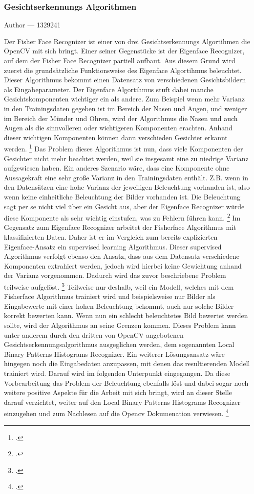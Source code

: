 \documentclass[12pt, a4paper]{report}
\makeatletter
\newcommand{\sectionauthor}[1]{%
  {\parindent0pt\vspace*{-5pt}%
  \large{Author --- }
  \linespread{1.1}\large\scshape#1%
  \par\nobreak\vspace*{35pt} }
  \@afterheading%
}
\makeatother
\begin{document}
\subsubsection{Gesichtserkennungs Algorithmen}
\sectionauthor{1329241}
Der Fisher Face Recognizer ist einer von drei Gesichtserkennungs Algortihmen die OpenCV mit sich bringt. Einer seiner Gegenstücke ist der Eigenface Recognizer, auf dem der Fisher Face Recognizer partiell aufbaut. Aus diesem Grund wird zuerst die grundsätzliche Funktionsweise des Eigenface Algortihmus beleuchtet. Dieser Algorithmus bekommt einen Datensatz von verschiedenen Gesichtsbildern als Eingabeparameter. Der Eigenface Algortihmus stuft dabei manche Gesichtskomponenten wichtiger ein als andere. Zum Beispiel wenn mehr Varianz in den Trainingsdaten gegeben ist im Bereich der Nasen und Augen, und weniger im Bereich der Münder und Ohren, wird der Algorithmus die Nasen und auch Augen als die sinnvolleren oder wichtigeren Komponenten erachten. Anhand dieser wichtigen Komponenten können dann verschieden Gesichter erkannt werden.
\footcite[Vgl.][]{Eigenface}
Das Problem dieses Algorithmus ist nun, dass viele Komponenten der Gesichter nicht mehr beachtet werden, weil sie insgesamt eine zu niedrige Varianz aufgewiesen haben. Ein anderes Szenario wäre, dass eine Komponente ohne Aussagekraft eine sehr große Varianz in den Trainingsdaten enthält. Z.B. wenn in den Datensätzen eine hohe Varianz der jeweiligen Beleuchtung vorhanden ist, also wenn keine einheitliche Beleuchtung der Bilder vorhanden ist. Die Beleuchtung sagt per se nicht viel über ein Gesicht aus, aber der Eigenface Recognizer würde diese Komponente als sehr wichtig einstufen, was zu Fehlern führen kann.
\footcite[Vgl.][]{Fisherface}
Im Gegensatz zum Eigenface Recognizer arbeitet der Fisherface Algorithmus mit klassifizierten Daten. Daher ist er im Vergleich zum bereits explizierten Eigenface-Ansatz ein supervised learning Algorithmus. Dieser supervised Algorithmus verfolgt ebenso den Ansatz, dass aus dem Datensatz verschiedene Komponenten extrahiert werden, jedoch wird hierbei keine Gewichtung anhand der Varianz vorgenommen. Dadurch wird das zuvor beschriebene Problem teilweise aufgelöst. 
\footcite[Vgl.][How to fix this issue]{Eigenface}
Teilweise nur deshalb, weil ein Modell, welches mit dem Fisherface Algorithmus trainiert wird und beispielsweise nur Bilder als Eingabewerte mit einer hohen Beleuchtung bekommt, auch nur solche Bilder korrekt bewerten kann. Wenn nun ein schlecht beleuchtetes Bild bewertet werden sollte, wird der Algorithmus an seine Grenzen kommen.
Dieses Problem kann unter anderem durch den dritten von OpenCV angebotenen Gesichtserkennungsalgorithmus ausgeglichen werden, dem sogenannten Local Binary Patterns Histograms Recognizer. Ein weiterer Lösungsansatz wäre hingegen noch die Eingabedaten anzupassen, mit denen das resultierenden Modell trainiert wird. Darauf wird im folgenden Unterpunkt \pageref{subsec: Eingabe Daten} eingegangen. Da diese Vorbearbeitung das Problem der Beleuchtung ebenfalls löst und dabei sogar noch weitere positive Aspekte für die Arbeit mit sich bringt, wird an dieser Stelle darauf verzichtet, weiter auf den Local Binary Patterns Histograms Recognizer einzugehen und zum Nachlesen auf die Opencv Dokumenation verwiesen. 
\footcite[Vgl.][]{Recognizer} 
\end{document}
